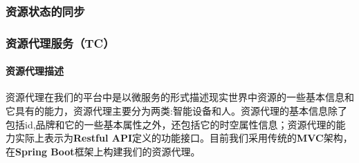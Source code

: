 \documentclass[12pt,a4paper]{article}
\begin{document}
\subsubsection{资源状态的同步}
\subsubsection{资源代理服务（TC）}
\paragraph{资源代理描述}
资源代理在我们的平台中是以微服务的形式描述现实世界中资源的一些基本信息和它具有的能力，资源代理主要分为两类:智能设备和人。资源代理的基本信息除了包括id,品牌和它的一些基本属性之外，还包括它的时空属性信息；资源代理的能力实际上表示为\textbf{Restful API}定义的功能接口。目前我们采用传统的\textbf{MVC}架构，在\textbf{Spring Boot}框架上构建我们的资源代理。
\end{document}
